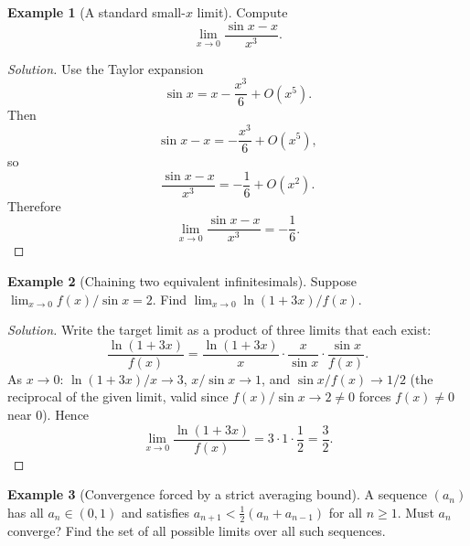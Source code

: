 \documentclass[11pt]{article}
\theoremstyle{definition}
\newtheorem{example}{Example}[section]
\begin{document}
\begin{example}[A standard small-$x$ limit]
Compute
\[
\lim_{x\to 0}\frac{\sin x - x}{x^3}.
\]
\end{example}

\begin{proof}[Solution]
Use the Taylor expansion
\[
\sin x = x - \frac{x^3}{6} + O(x^5).
\]
Then
\[
\sin x - x = -\frac{x^3}{6} + O(x^5),
\]
so
\[
\frac{\sin x - x}{x^3} = -\frac16 + O(x^2).
\]
Therefore
\[
\boxed{\lim_{x\to 0}\frac{\sin x - x}{x^3}=-\frac16}.
\]
\end{proof}

\begin{example}[Chaining two equivalent infinitesimals]
Suppose $\lim_{x\to 0} f(x)/\sin x=2$. Find $\lim_{x\to 0}\ln(1+3x)/f(x)$.
\end{example}

\begin{proof}[Solution]
Write the target limit as a product of three limits that each exist:
\[
\frac{\ln(1+3x)}{f(x)}=\frac{\ln(1+3x)}{x}\cdot\frac{x}{\sin x}\cdot\frac{\sin x}{f(x)}.
\]
As $x\to 0$: $\ln(1+3x)/x\to 3$, $x/\sin x\to 1$, and $\sin x/f(x)\to 1/2$ (the reciprocal of the given limit, valid since $f(x)/\sin x\to2\neq0$ forces $f(x)\neq0$ near $0$). Hence
\[
\boxed{\lim_{x\to 0}\frac{\ln(1+3x)}{f(x)}=3\cdot 1\cdot\frac12=\frac32}.
\]
\end{proof}

\begin{example}[Convergence forced by a strict averaging bound]
A sequence $(a_n)$ has all $a_n\in(0,1)$ and satisfies $a_{n+1}<\tfrac12(a_n+a_{n-1})$ for all $n\ge1$. Must $a_n$ converge? Find the set of all possible limits over all such sequences.
\end{example}
\end{document}
